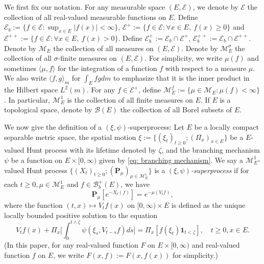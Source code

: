\documentclass[12pt, a4paper]{amsart}
\theoremstyle{definition}
\numberwithin{equation}{section}
\begin{document}
	We first fix our notation.
	For any measurable space $(E,\mathscr E)$, we denote by $\mathscr E$ the collection of all real-valued measurable functions on $E$.
	Define $\mathscr E_b :=\{f \in \mathscr E: \sup_{x\in E}|f(x)|<\infty \}$, $\mathscr E^+ :=\{f\in \mathscr E: \forall x\in E,~f(x)\geq 0\}$ and $\mathscr E^{++} :=\{f\in \mathscr E: \forall x\in E,~f(x)> 0\}$.
	Define $\mathscr E^+_b := \mathscr E_b \cap \mathscr E^+$, $\mathscr E^{++}_b:= \mathscr E_b \cap \mathscr E^{++}$.	
	Denote by $\mathcal M_E$ the collection of all measures on $(E,\mathscr E)$.
	Denote by $\mathcal M^\sigma_E$ the collection of all  $\sigma$-finite measures on $(E,\mathscr E)$.
	For simplicity, we write 
	$\mu(f)$ and sometimes $\langle \mu, f\rangle$
	for the integration of a function $f$ with respect to a measure $\mu$.
    We also write $\langle f, g\rangle_m$ for $\int_E fg dm$  
    to emphasize that it is the inner product 
    in the Hilbert space $L^2(m)$.
	For any $f \in \mathscr E^+$, define $\mathcal M^f_E:= \{\mu \in \mathcal M_E: \mu(f) < \infty\}$.
	In particular, $\mathcal M^1_E$ is the collection of all  finite measures on $E$.
	If $E$ is a topological space, denote by $\mathscr B(E)$ the collection of all  Borel subsets of $E$.
	
	We now give the definition of a $(\xi, \psi)$-superprocess:
	Let $E$ be a locally compact separable metric space,
	the spatial motion
   $\xi:=\{(\xi_t)_{t\geq 0};(\Pi_x)_{x\in E}\}$ 
	be a $E$-valued Hunt process with its lifetime denoted by $\zeta$, and the branching mechanism $\psi$ be a function on $E\times[0,\infty)$ given by
	\eqref{eq: branching mechanism}.
	We say a $\mathcal M^1_E$-valued Hunt process 
	$\{(X_t)_{t\geq 0}; (\mathbf P_\mu)_{\mu \in \mathcal M^1_E}\}$
	is a \emph{$(\xi,\psi)$-superprocess} if for each $t\geq 0, \mu \in \mathcal M_E^1$ and  $f\in \mathscr B^+_b(E)$, we have
\[
	\mathbf P_\mu [e^{-X_t(f)}] = e^{-\mu(V_tf)},
\]
	where the function $(t,x) \mapsto V_tf(x)$ on $[0,\infty) \times E$ is defined as the unique locally bounded positive solution to the equation
\[\label{eq:FKPP_in_definition}
	V_t f(x) + \Pi_x \Big[  \int_0^{t\wedge \zeta} \psi (\xi_s,V_{t-s} f) ds \Big]
	=\Pi_x [ f(\xi_t)\mathbf 1_{t<\zeta} ],\quad
	t\geq 0, x \in E.
\]
	(In this paper, for any real-valued function $F$ on $E\times [0,\infty)$ and real-valued function $f$ on $E$, we write $F(x,f):= F(x,f(x))$ for simplicity.)
\end{document}
